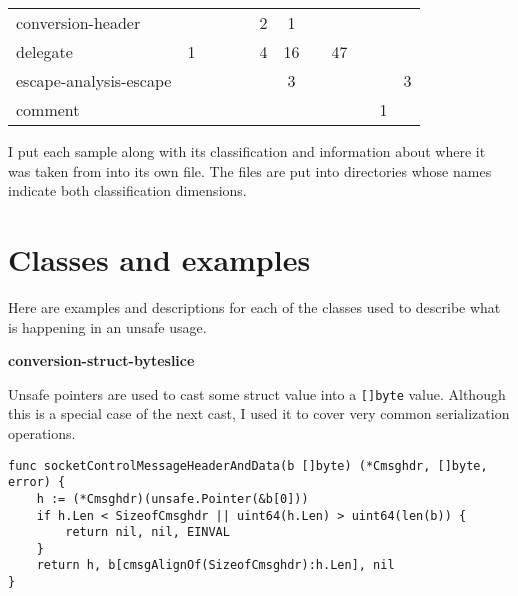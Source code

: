 \begin{table}[h]
\begin{tabularx}{\textwidth}{Xccccccccccc}
        \rowcolor{verylightgray}
                        conversion-header &       &                &            &               &     2 &      1 &     &            &             &        &                        \\
                                 delegate &     1 &                &            &               &     4 &     16 &     &         47 &             &        &                        \\
        \rowcolor{verylightgray}
                   escape-analysis-escape &       &                &            &               &       &      3 &     &            &             &        &                      3 \\
                                  comment &       &                &            &               &       &        &     &            &             &      1 &                        \\
        \bottomrule
    \end{tabularx}
\end{table}

I put each sample along with its classification and information about where it was taken from into its own file.
The files are put into directories whose names indicate both classification dimensions.



\section{Classes and examples}\label{sec:survey-small-classes}

Here are examples and descriptions for each of the classes used to describe what is happening in an unsafe usage.

\textbf{conversion-struct-byteslice}

Unsafe pointers are used to cast some struct value into a \texttt{[]byte} value.
Although this is a special case of the next cast, I used it to cover very common serialization operations.

\begin{lstlisting}[language=Golang, label=lst:survey-small-classexample-conversion-struct-byteslice, caption=Usage class example: conversion-struct-byteslice]
func socketControlMessageHeaderAndData(b []byte) (*Cmsghdr, []byte, error) {
    h := (*Cmsghdr)(unsafe.Pointer(&b[0]))
    if h.Len < SizeofCmsghdr || uint64(h.Len) > uint64(len(b)) {
        return nil, nil, EINVAL
    }
    return h, b[cmsgAlignOf(SizeofCmsghdr):h.Len], nil
}
\end{lstlisting}


